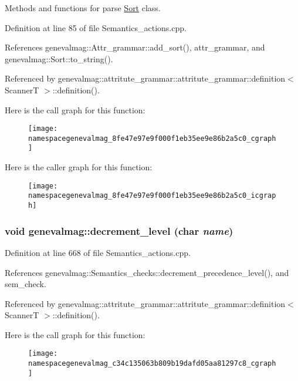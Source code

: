 Methods and functions for parse \hyperlink{classgenevalmag_1_1Sort}{Sort} class. 

Definition at line 85 of file Semantics\_\-actions.cpp.

References genevalmag::Attr\_\-grammar::add\_\-sort(), attr\_\-grammar, and genevalmag::Sort::to\_\-string().

Referenced by genevalmag::attritute\_\-grammar::attritute\_\-grammar::definition$<$ ScannerT $>$::definition().

Here is the call graph for this function:\nopagebreak
\begin{figure}[H]
\begin{center}
\leavevmode
\texttt{[image: namespacegenevalmag\_8fe47e97e9f000f1eb35ee9e86b2a5c0\_cgraph]}
\end{center}
\end{figure}


Here is the caller graph for this function:\nopagebreak
\begin{figure}[H]
\begin{center}
\leavevmode
\texttt{[image: namespacegenevalmag\_8fe47e97e9f000f1eb35ee9e86b2a5c0\_icgraph]}
\end{center}
\end{figure}
\hypertarget{namespacegenevalmag_c34c135063b809b19dafd05aa81297c8}{
\subsubsection[{decrement\_\-level}]{\setlength{\rightskip}{0pt plus 5cm}void genevalmag::decrement\_\-level (char {\em name})}}
\label{namespacegenevalmag_c34c135063b809b19dafd05aa81297c8}




Definition at line 668 of file Semantics\_\-actions.cpp.

References genevalmag::Semantics\_\-checks::decrement\_\-precedence\_\-level(), and sem\_\-check.

Referenced by genevalmag::attritute\_\-grammar::attritute\_\-grammar::definition$<$ ScannerT $>$::definition().

Here is the call graph for this function:\nopagebreak
\begin{figure}[H]
\begin{center}
\leavevmode
\texttt{[image: namespacegenevalmag\_c34c135063b809b19dafd05aa81297c8\_cgraph]}
\end{center}
\end{figure}


